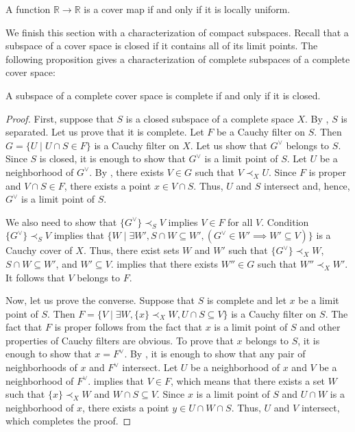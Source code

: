 \documentclass[reqno]{amsart}
\theoremstyle{definition}
\theoremstyle{remark}
\numberwithin{figure}{section}
\newcommand{\rb}{\prec}
\begin{document}
\begin{cor}
A function $\mathbb{R} \to \mathbb{R}$ is a cover map if and only if it is locally uniform.
\end{cor}

We finish this section with a characterization of compact subspaces.
Recall that a subspace of a cover space is closed if it contains all of its limit points.
The following proposition gives a characterization of complete subspaces of a complete cover space:

\begin{prop}
A subspace of a complete cover space is complete if and only if it is closed.
\end{prop}
\begin{proof}
First, suppose that $S$ is a closed subspace of a complete space $X$.
By , $S$ is separated.
Let us prove that it is complete.
Let $F$ be a Cauchy filter on $S$.
Then $G = \{ U \mid U \cap S \in F \}$ is a Cauchy filter on $X$.
Let us show that $G^\vee$ belongs to $S$.
Since $S$ is closed, it is enough to show that $G^\vee$ is a limit point of $S$.
Let $U$ be a neighborhood of $G^\vee$.
By , there exists $V \in G$ such that $V \rb_X U$.
Since $F$ is proper and $V \cap S \in F$, there exists a point $x \in V \cap S$.
Thus, $U$ and $S$ intersect and, hence, $G^\vee$ is a limit point of $S$.

We also need to show that $\{ G^\vee \} \rb_S V$ implies $V \in F$ for all $V$.
Condition $\{ G^\vee \} \rb_S V$ implies that $\{ W \mid \exists W', S \cap W \subseteq W', (G^\vee \in W' \implies W' \subseteq V) \}$ is a Cauchy cover of $X$.
Thus, there exist sets $W$ and $W'$ such that $\{ G^\vee \} \rb_X W$, $S \cap W \subseteq W'$, and $W' \subseteq V$.
 implies that there exists $W'' \in G$ such that $W'' \rb_X W'$.
It follows that $V$ belongs to $F$.

Now, let us prove the converse.
Suppose that $S$ is complete and let $x$ be a limit point of $S$.
Then $F = \{ V \mid \exists W, \{ x \} \rb_X W, U \cap S \subseteq V \}$ is a Cauchy filter on $S$.
The fact that $F$ is proper follows from the fact that $x$ is a limit point of $S$ and other properties of Cauchy filters are obvious.
To prove that $x$ belongs to $S$, it is enough to show that $x = F^\vee$.
By , it is enough to show that any pair of neighborhoods of $x$ and $F^\vee$ intersect.
Let $U$ be a neighborhood of $x$ and $V$ be a neighborhood of $F^\vee$.
 implies that $V \in F$, which means that there exists a set $W$ such that $\{ x \} \rb_X W$ and $W \cap S \subseteq V$.
Since $x$ is a limit point of $S$ and $U \cap W$ is a neighborhood of $x$, there exists a point $y \in U \cap W \cap S$.
Thus, $U$ and $V$ intersect, which completes the proof.
\end{proof}
\end{document}
